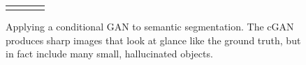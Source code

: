 \begin{figure}
\begin{tabular}{cccc}
\begin{center}
\end{center}
\end{tabular} \egroup 

\vspace{-0.1in}
\caption{Applying a conditional GAN to semantic segmentation. The cGAN produces sharp images that look at glance like the ground truth, but in fact include many small, hallucinated objects.}
\label{cityscapes_image_to_labels}
\end{figure}